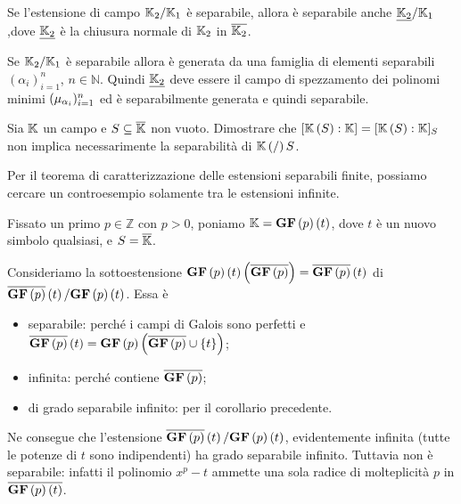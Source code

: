 \begin{Theorem}	
	Se l'estensione di campo $\mathbb{K}_2/\mathbb{K}_1$ \`e separabile, allora \`e separabile anche $\FieldExtension{\NormalClosure{\Field_2}}{\Field_1}$,dove
	$\NormalClosure{\Field_2}$ \`e la chiusura normale di $\mathbb{K}_2$ in $\overline{\mathbb{K}_2}$.
\end{Theorem}
\Proof Se $\mathbb{K}_2/\mathbb{K}_1$ \`e separabile allora \`e generata da una famiglia di elementi separabili $(\alpha_i)_{i = 1}^n$, $n \in \mathbb{N}$. Quindi $\NormalClosure{\Field_2}$ deve essere il campo di spezzamento dei polinomi minimi $(\MinimalPolynomial{\alpha_i})_{i =1}^n$ ed \`e separabilmente generata e quindi separabile. \EndProof
\begin{Exercice}
	Sia $\mathbb{K}$ un campo e $S \subseteq \overline{\mathbb{K}}$ non vuoto. Dimostrare che $[\mathbb{K} \left ( S \right ):\mathbb{K}] = [\mathbb{K} \left ( S \right ):\mathbb{K}]_S$ non implica necessarimente la separabilit\`a di $\mathbb{K} \left ( / \right )S$.
\end{Exercice}
\Solution Per il teorema di caratterizzazione delle estensioni separabili finite, possiamo cercare un controesempio solamente tra le estensioni infinite.
\par Fissato un primo $p \in \mathbb{Z}$ con $p > 0$, poniamo $\mathbb{K} = \textbf{GF} \left ( p \right ) \left ( t \right )$, dove $t$ \`e un nuovo simbolo qualsiasi, e $S = \overline{\mathbb{K}}$.
\par Consideriamo la sottoestensione $\textbf{GF} \left ( p \right ) \left ( t \right ) \left ( \overline{\textbf{GF} \left ( p \right )} \right ) = \overline{\textbf{GF} \left ( p \right )} \left ( t \right )$ di $\overline{\textbf{GF} \left ( p \right )} \left ( t \right )/\textbf{GF} \left ( p \right ) \left ( t \right )$. Essa \`e
\begin{itemize}
	\item separabile: perch\'e i campi di Galois sono perfetti e $\overline{\textbf{GF} \left ( p \right )} \left ( t \right ) = \textbf{GF} \left ( p \right ) \left ( \overline{\textbf{GF} \left ( p \right )} \cup \lbrace t \rbrace \right )$;
	\item infinita: perch\'e contiene $\overline{\textbf{GF} \left ( p \right )}$;
	\item di grado separabile infinito: per il corollario precedente.
\end{itemize}
\par Ne consegue che l'estensione $\overline{\textbf{GF} \left ( p \right )} \left ( t \right )/\textbf{GF} \left ( p \right ) \left ( t \right )$, evidentemente infinita (tutte le potenze di $t$ sono indipendenti) ha grado separabile infinito. Tuttavia non \`e separabile: infatti il polinomio $x^p - t$ ammette una sola radice di molteplicit\`a $p$ in $\overline{\textbf{GF} \left ( p \right ) \left ( t \right )}$. \EndSolution
